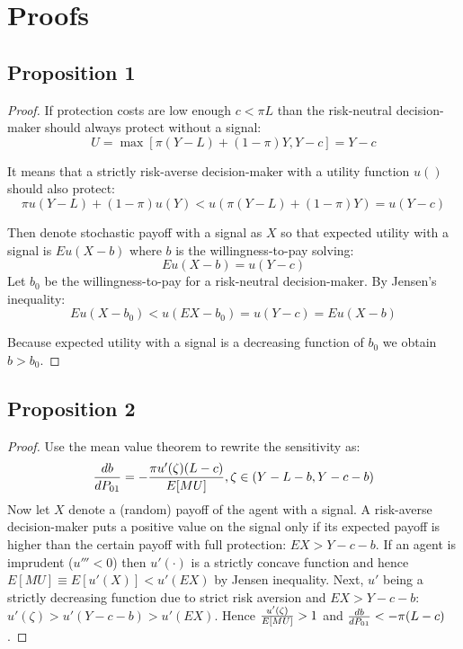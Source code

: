 \documentclass[12pt,a4paper]{article}
\begin{document}
 \label{ip_tab}

 \label{wtp_dem}


 \label{tab:wtp_risk}






\newpage
\section{Proofs}
\small

\subsection{Proposition 1}
\begin{proof} If protection costs are low enough $c<\pi L$ than the risk-neutral decision-maker should always protect without a signal:
$$U=\max[\pi(Y-L)+(1-\pi)Y,Y-c]=Y-c$$

It means that a strictly risk-averse decision-maker with a utility function $u()$ should also protect:
$$\pi u(Y-L)+(1-\pi)u(Y)<u(\pi(Y-L)+(1-\pi)Y)=u(Y-c)$$

Then denote stochastic payoff with a signal as $X$ so that expected utility with a signal is $Eu(X-b)$ where $b$ is the willingness-to-pay solving:
$$Eu(X-b)=u(Y-c)$$
 Let $b_0$ be the willingness-to-pay for a risk-neutral decision-maker. By Jensen's inequality:
$$Eu(X-b_0)<u(EX-b_0)=u(Y-c)=Eu(X-b)$$

Because expected utility with a signal is a decreasing function of $b_0$ we obtain $b>b_0$. \end{proof} 

\subsection{Proposition 2}
\begin{proof}
Use the mean value theorem to rewrite the sensitivity as:
$${db\over dP_{01}}=-{\pi u'(\zeta)(L-c)\over E[MU]},\zeta \in \left(Y-L-b, Y-c-b\right)$$
Now let $X$ denote a (random) payoff of the agent with a signal. A risk-averse decision-maker puts a positive value on the signal only if its expected payoff is higher than the certain payoff with full protection: $EX>Y-c-b$. If an agent is imprudent ($u'''<0$) then $u'(\cdot)$ is a strictly concave function and hence $E[MU]\equiv E[u'(X)]<u'(EX)$ by Jensen inequality. Next, $u'$ being a strictly decreasing function due to strict risk aversion and $EX>Y-c-b$: $u'(\zeta)>u'(Y-c-b)>u'(EX)$. Hence ${u'(\zeta)\over E[MU]}>1$ and ${db\over dP_{01}}<-\pi(L-c)$. 
\end{proof}
\end{document}

